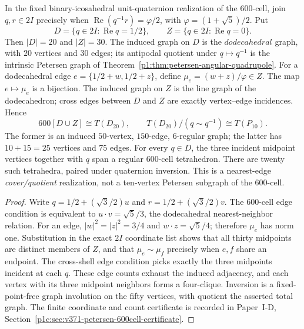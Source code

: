 \documentclass[11pt]{article}
\begin{document}
\begin{theorem}
\label{p1:thm:v371-petersen-600cell-total-cover}
In the fixed binary-icosahedral unit-quaternion realization of the
$600$-cell, join $q,r\in2I$ precisely when
$\operatorname{Re}(q^{-1}r)=\varphi/2$, with
$\varphi=(1+\sqrt5)/2$. Put
\[
 D=\{q\in2I:\operatorname{Re}q=1/2\},\qquad
 Z=\{q\in2I:\operatorname{Re}q=0\}.
\]
Then $|D|=20$ and $|Z|=30$. The induced graph on $D$ is the
$dodecahedral$ graph, with $20$ vertices and $30$ edges; its antipodal
quotient under $q\mapsto q^{-1}$ is the intrinsic Petersen graph of
Theorem~\ref{p1:thm:petersen-angular-quadrupole}.
For a dodecahedral edge $e=\{1/2+w,1/2+z\}$, define
$\mu_e=(w+z)/\varphi\in Z$. The map $e\mapsto\mu_e$ is a bijection.
The induced graph on $Z$ is the line graph of the dodecahedron; cross
edges between $D$ and $Z$ are exactly vertex--edge incidences. Hence
\[
 \boxed{600[D\cup Z]\cong T(D_{20}),\qquad
 T(D_{20})/(q\sim q^{-1})\cong T(P_{10}).}
\]
The former is an induced $50$-vertex, $150$-edge, $6$-regular graph; the
latter has $10+15=25$ vertices and $75$ edges. For every $q\in D$, the
three incident midpoint vertices together with $q$ span a regular
$600$-cell tetrahedron. There are twenty such tetrahedra, paired under
quaternion inversion. This is a nearest-edge \emph{cover/quotient}
realization, not a ten-vertex Petersen subgraph of the $600$-cell.
\end{theorem}
\begin{proof}
Write $q=1/2+(\sqrt3/2)u$ and $r=1/2+(\sqrt3/2)v$.
The $600$-cell edge condition is equivalent to
$u\cdot v=\sqrt5/3$, the dodecahedral nearest-neighbor relation.
For an edge, $|w|^2=|z|^2=3/4$ and $w\cdot z=\sqrt5/4$;
therefore $\mu_e$ has norm one. Substitution in the exact $2I$
coordinate list shows that all thirty midpoints are distinct members
of $Z$, and that $\mu_e\sim\mu_f$ precisely when $e,f$ share an
endpoint. The cross-shell edge condition picks exactly the three
midpoints incident at each $q$. These edge counts exhaust the induced
adjacency, and each vertex with its three midpoint neighbors forms
a four-clique. Inversion is a fixed-point-free graph involution on the
fifty vertices, with quotient the asserted total graph. The finite
coordinate and count certificate is recorded in
Paper~I-D, Section~\ref{p1c:sec:v371-petersen-600cell-certificate}.
\end{proof}
\end{document}
